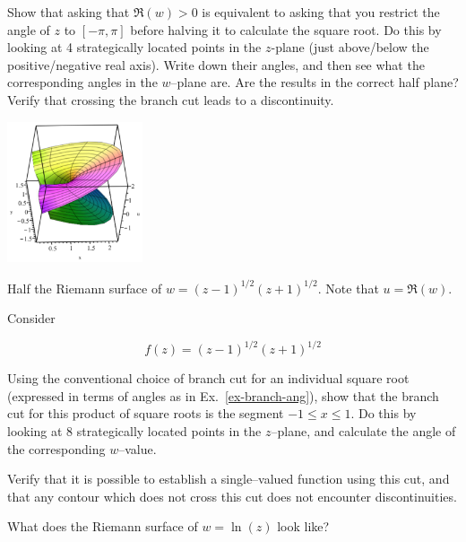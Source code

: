 \begin{exer}
\label{ex-branch-ang}
Show that asking that $\Re(w)>0$ is equivalent to asking that you restrict the angle of $z$ to $[-\pi, \pi]$ before halving it to calculate the square root. Do this by looking at 4 strategically located points in the $z$-plane (just above/below the positive/negative real axis). Write down their angles, and then see what the corresponding angles in the $w$--plane are. Are the results in the correct half plane? Verify that crossing the branch cut leads to a discontinuity. 
\end{exer}

\begin{exer}
  \label{ex-product-roots}
\begin{marginfigure}[0.5cm]
\centering
\includegraphics[width=4cm]{complex/figures/riemann2}
\caption{Half the Riemann surface of $w=(z-1)^{1/2}(z+1)^{1/2}$. Note that $u=\Re(w)$. }
\label{fig-riemann2}
\end{marginfigure}
Consider

$$f(z)=(z-1)^{1/2}(z+1)^{1/2}$$

Using the conventional choice of branch cut for an individual square root (expressed in terms of angles as in Ex.~\ref{ex-branch-ang}), show that the branch cut for this product of square roots is the segment $-1 \le x \le 1$. Do this by looking at 8 strategically located points in the $z$--plane, and calculate the angle of the corresponding $w$--value.


Verify that it is possible to establish a single--valued function using this cut, and that any contour which does not cross this cut does not encounter discontinuities.
\end{exer}

\begin{exer}
What does the Riemann surface of $w=\ln(z)$ look like?
\end{exer}

